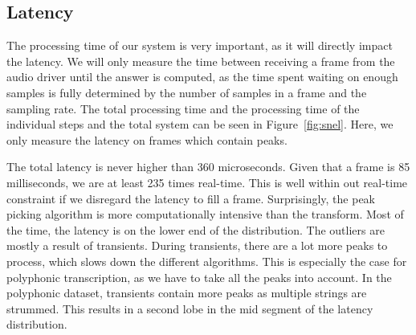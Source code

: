 \documentclass[10pt,twocolumn]{article}
\begin{document}
\subsection{Latency}  \label{sub:algspeed}
The processing time of our system is very important, as it will directly impact the latency. We will only measure the time between receiving a frame from the audio driver until the answer is computed, as the time spent waiting on enough samples is fully determined by the number of samples in a frame and the sampling rate. The total processing time and the processing time of the individual steps and the total system can be seen in Figure~\ref{fig:snel}. Here, we only measure the latency on frames which contain peaks.

The total latency is never higher than 360 microseconds. Given that a frame is 85 milliseconds, we are at least 235 times real-time. This is well within out real-time constraint if we disregard the latency to fill a frame. Surprisingly, the peak picking algorithm is more computationally intensive than the transform. Most of the time, the latency is on the lower end of the distribution. The outliers are mostly a result of transients. During transients, there are a lot more peaks to process, which slows down the different algorithms. This is especially the case for polyphonic transcription, as we have to take all the peaks into account. In the polyphonic dataset, transients contain more peaks as multiple strings are strummed. This results in a second lobe in the mid segment of the latency distribution.
\end{document}
